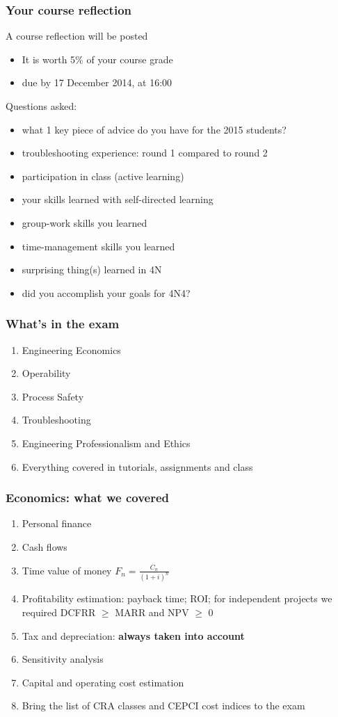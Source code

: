 \begin{frame}\frametitle{Your course reflection}
	A course reflection will be posted
	\begin{itemize}
		\item	It is worth 5\% of your course grade
		\item	due by 17 December 2014, at 16:00
	\end{itemize}
	
	\vspace{24pt}
	{\color{myOrange}Questions asked:}
	\begin{itemize}
		\item	what 1 key piece of advice do you have for the 2015 students?
		\item	troubleshooting experience: round 1 compared to round 2
		\item	participation in class (active learning)
		\item	your skills learned with self-directed learning
		\item	group-work skills you learned
		\item	time-management skills you learned
		\item	surprising thing(s) learned in 4N
		\item	did you accomplish your goals for 4N4?
	\end{itemize}
\end{frame}

\begin{frame}\frametitle{What's in the exam}
	\begin{enumerate}
		\item	Engineering Economics
		\item	Operability
		\item	Process Safety
		\item	Troubleshooting
		\item	Engineering Professionalism and Ethics
		\item	Everything covered in tutorials, assignments and class
	\end{enumerate}
\end{frame}

\begin{frame}\frametitle{Economics: what we covered}
	\begin{enumerate}
		\item	Personal finance
		\item	Cash flows
		\item	Time value of money $\displaystyle F_n = \frac{C_n}{(1+i)^n}$
		\item	Profitability estimation: payback time; ROI; for independent projects we required DCFRR $\geq$ MARR and NPV $\geq$ 0
		\item	Tax and depreciation: \textbf{always taken into account}
		\item	Sensitivity analysis
		\item	Capital and operating cost estimation
		\item	{\color{red} Bring the list of CRA classes and CEPCI cost indices to the exam}
	\end{enumerate}
\end{frame}

